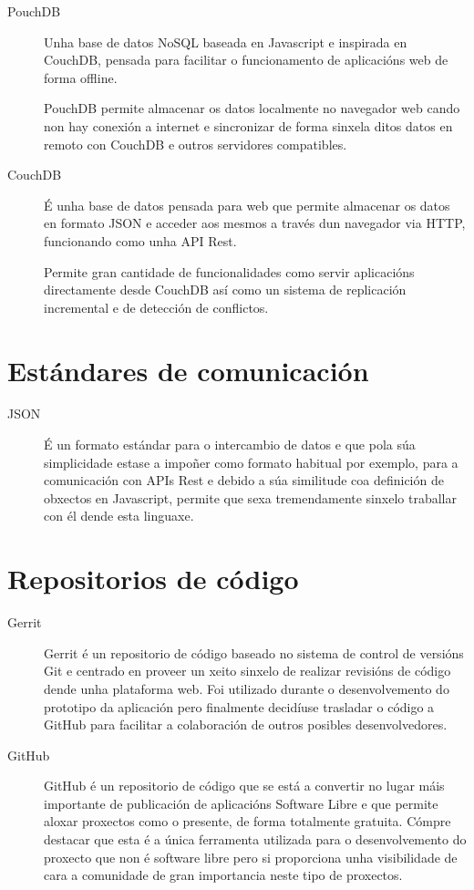   \begin{description}
     \item [PouchDB]\cite{web:pouchdb} Unha base de datos NoSQL 
baseada en Javascript e inspirada 
en CouchDB, pensada para facilitar o funcionamento de aplicacións web de forma 
offline.

PouchDB permite almacenar os datos localmente no navegador web cando non 
hay conexión a internet e sincronizar de forma sinxela ditos datos en remoto con 
CouchDB e outros servidores compatibles.

   \item [CouchDB]\cite{web:couchdb} É unha base de datos 
pensada para web que permite almacenar 
os datos en formato JSON e acceder aos mesmos a través dun navegador via HTTP, 
funcionando como unha API Rest.

    Permite gran cantidade de funcionalidades como servir aplicacións 
directamente desde CouchDB así como un sistema de replicación incremental e de 
detección de conflictos.

  \end{description}

  \section{Estándares de comunicación}

  \begin{description}
   \item [JSON] \cite{web:json} É un formato estándar para o 
intercambio de datos e que pola súa 
simplicidade estase a impoñer como formato habitual por exemplo, para a comunicación con 
APIs Rest e debido a súa similitude coa definición de obxectos en Javascript, permite que 
sexa tremendamente sinxelo traballar con él dende esta linguaxe.
  \end{description}

  \section{Repositorios de código}

  \begin{description}
   \item [Gerrit]\cite{web:gerrit} Gerrit é 
un repositorio de código baseado no sistema de control de 
versións Git e centrado en proveer un xeito sinxelo de realizar revisións de 
código dende unha plataforma web. Foi utilizado durante o desenvolvemento do 
prototipo da aplicación pero finalmente decidíuse trasladar o código a GitHub 
para facilitar a colaboración de outros posibles desenvolvedores.
   \item [GitHub]\cite{web:github} GitHub é un repositorio de 
código que se está a convertir no lugar máis 
importante de publicación de aplicacións Software Libre e que permite aloxar proxectos 
como o presente, de forma totalmente gratuita.
  Cómpre destacar que esta é a única ferramenta utilizada para o desenvolvemento do 
proxecto que non é software libre pero si proporciona unha visibilidade de cara a 
comunidade de gran importancia neste tipo de proxectos.
  \end{description}

